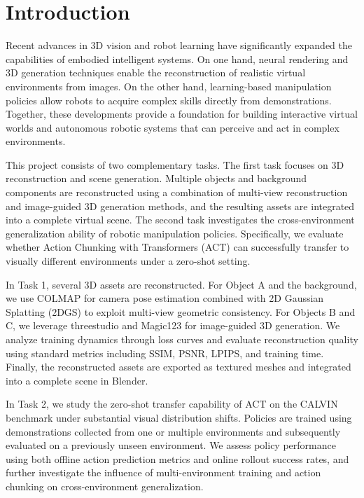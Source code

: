 \section{Introduction}

Recent advances in 3D vision and robot learning have significantly expanded the capabilities of embodied intelligent systems. On one hand, neural rendering and 3D generation techniques enable the reconstruction of realistic virtual environments from images. On the other hand, learning-based manipulation policies allow robots to acquire complex skills directly from demonstrations. Together, these developments provide a foundation for building interactive virtual worlds and autonomous robotic systems that can perceive and act in complex environments.

This project consists of two complementary tasks. The first task focuses on 3D reconstruction and scene generation. Multiple objects and background components are reconstructed using a combination of multi-view reconstruction and image-guided 3D generation methods, and the resulting assets are integrated into a complete virtual scene. The second task investigates the cross-environment generalization ability of robotic manipulation policies. Specifically, we evaluate whether Action Chunking with Transformers (ACT) can successfully transfer to visually different environments under a zero-shot setting.

In Task 1, several 3D assets are reconstructed. For Object A and the background, we use COLMAP for camera pose estimation combined with 2D Gaussian Splatting (2DGS) to exploit multi-view geometric consistency. For Objects B and C, we leverage threestudio and Magic123 for image-guided 3D generation. We analyze training dynamics through loss curves and evaluate reconstruction quality using standard metrics including SSIM, PSNR, LPIPS, and training time. Finally, the reconstructed assets are exported as textured meshes and integrated into a complete scene in Blender.

In Task 2, we study the zero-shot transfer capability of ACT on the CALVIN benchmark under substantial visual distribution shifts. Policies are trained using demonstrations collected from one or multiple environments and subsequently evaluated on a previously unseen environment. We assess policy performance using both offline action prediction metrics and online rollout success rates, and further investigate the influence of multi-environment training and action chunking on cross-environment generalization.
